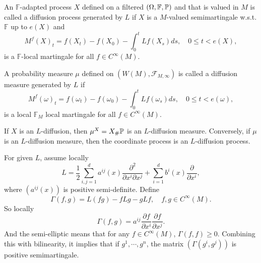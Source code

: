 \begin{defn}
    An $\mathbb{F}$-adapted process $X$ defined on a filtered $(\Omega,\mathbb{F},\mathbb{P})$ and that is valued in $M$ is called a diffusion process generated by $L$ if $X$ is a $M$-valued semimartingale w.s.t. $\mathbb{F}$ up to $e(X)$ and 
    \begin{equation*}
        M^f(X)_t = f(X_t) - f(X_0) - \int_0^tLf(X_s)ds,\quad 0 \leq t < e(X),
    \end{equation*}
    is a $\mathbb{F}$-local martingale for all $f \in C^\infty(M)$.

    \item A probability measure $\mu$ defined on $(W(M),\mathcal{F}_{M,\infty})$ is called a diffusion measure generated by $L$ if
    \begin{equation*}
        M^f(\omega)_t=f\left(\omega_t\right)-f\left(\omega_0\right)-\int_0^t L f\left(\omega_s\right) d s, \quad 0 \leq t<e(\omega),
    \end{equation*}
    is a local $\mathbb{F}_M$ local martingale for all $f \in C^\infty(M)$.
\end{defn}
\begin{rmk}
    If $X$ is an $L$-diffusion, then $\mu^X =X_{\#}\mathbb{P}$ is an $L$-diffusion measure. Conversely, if $\mu$ is an $L$-diffusion measure, then the coordinate process is an $L$-diffusion process.
\end{rmk}

For given $L$, assume locally
\begin{equation*}
    L=\frac{1}{2} \sum_{i, j=1}^d a^{i j}(x) \frac{\partial^2}{\partial x^i \partial x^j}+\sum_{i=1}^d b^i(x) \frac{\partial}{\partial x^i},
\end{equation*}
where $(a^{ij}(x))$ is positive semi-definite. Define
\begin{equation*}
    \Gamma(f,g) = L(fg) - fLg - gLf,\quad f,g \in C^\infty(M).
\end{equation*}
So locally
\begin{equation*}
    \Gamma(f,g) = a^{ij}\frac{\partial f}{\partial x^i} \frac{\partial f}{\partial x^j}.
\end{equation*}
And the semi-elliptic means that for any $f \in C^\infty(M)$, $\Gamma(f,f) \geq 0$. Combining this with bilinearity, it implies that if $g^1,\cdots,g^n$, the matrix $(\Gamma(g^i,g^j))$ is positive semimartingale.

